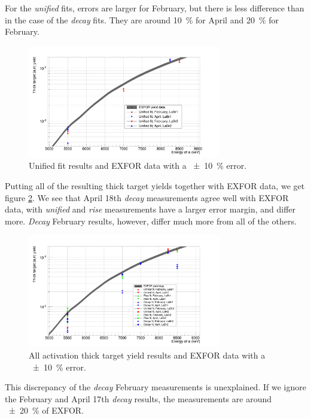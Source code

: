 \documentclass[a4paper,12pt]{report}
\begin{document}
For the \textit{unified} fits, errors are larger for February, but there is less difference than in the case of the \textit{decay} fits.
They are around \qty{10}{\percent} for April and \qty{20}{\percent} for February.

\begin{figure}[H]
	\centering
	\includegraphics[width=0.75\textwidth]{reactions_v_energy_unified.png}
	\caption{Unified fit results and EXFOR data with a \qty{\pm 10}{\percent} error.}
	\label{reactions_v_energy_unified}
\end{figure}

Putting all of the resulting thick target yields together with EXFOR data, we get figure \ref{reactions_v_energy}.
We see that April 18th \textit{decay} measurements agree well with EXFOR data, with \textit{unified} and \textit{rise} measurements have a larger error margin, and differ more.
\textit{Decay} February results, however, differ much more from all of the others.

\begin{figure}[H]
	\centering
	\includegraphics[width=0.75\textwidth]{reactions_v_energy.png}
	\caption{All activation thick target yield results and EXFOR data with a \qty{\pm 10}{\percent} error.}
	\label{reactions_v_energy}
\end{figure}

This discrepancy of the \textit{decay} February measurements is unexplained.
If we ignore the February and April 17th \textit{decay} results, the measurements are around \qty{\pm 20}{\percent} of EXFOR.
\end{document}
